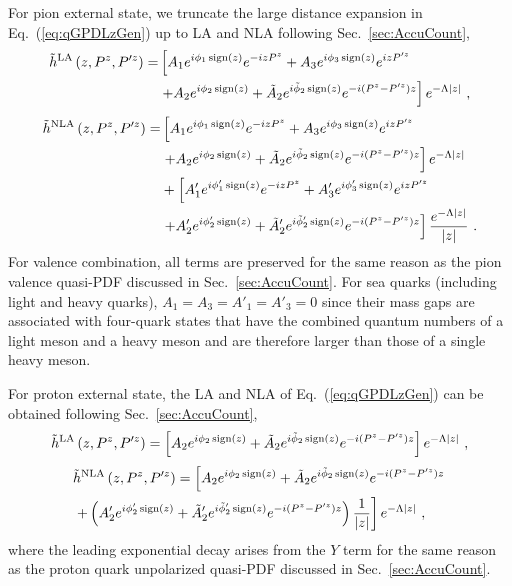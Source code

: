 \documentclass[a4paper,11pt]{article}
\begin{document}
For pion external state, we truncate the large distance expansion in Eq.~(\ref{eq:qGPDLzGen}) up to LA and NLA following Sec.~\ref{sec:AccuCount},
\begin{align}
\tilde{h}^{\rm LA}\left(z,P^z,P'^z\right) =
&\left[A_1 e^{i \phi_1 \, {\rm sign}(z)} e^{-i z P^z} + A_3 e^{i \phi_3 \, {\rm sign}(z)} e^{i z P'^z}  \right. \nonumber\\
&\left.+A_2 e^{i \phi_2 \, {\rm sign}(z)} + \tilde{A}_2 e^{i \tilde{\phi}_2 \, {\rm sign}(z)} e^{-i(P^z-P'^z)z}  \right] e^{-\Lambda |z|} \ ,
\end{align}
\begin{align}
\tilde{h}^{\rm NLA}\left(z,P^z,P'^z\right) =
&\left[A_1 e^{i \phi_1 \, {\rm sign}(z)} e^{-i z P^z}  + A_3 e^{i \phi_3 \, {\rm sign}(z)} e^{i z P'^z} \right. \nonumber\\
&\left.+A_2 e^{i \phi_2 \, {\rm sign}(z)} + \tilde{A}_2 e^{i \tilde{\phi}_2 \, {\rm sign}(z)} e^{-i(P^z-P'^z)z}\right]e^{-\Lambda |z|} \nonumber\\ 
&+\left[A'_1 e^{i \phi'_1 \, {\rm sign}(z)} e^{-i z P^z} + A'_3 e^{i \phi'_3 \, {\rm sign}(z)} e^{i z P'^z} \right. \nonumber\\
&\left.+A'_2 e^{i \phi'_2 \, {\rm sign}(z)} + \tilde{A}'_2 e^{i \tilde{\phi}'_2 \, {\rm sign}(z)} e^{-i(P^z-P'^z)z} \right] \frac{e^{-\Lambda |z|}}{|z|} \ .
\end{align}
For valence combination, all terms are preserved for the same reason as the pion valence quasi-PDF discussed in Sec.~\ref{sec:AccuCount}. For sea quarks (including light and heavy quarks), $A_1 = A_3 = A'_1 = A'_3 = 0$ since their mass gaps are associated with four-quark states that have the combined quantum numbers of a light meson and a heavy meson and are therefore larger than those of a single heavy meson.

For proton external state, the LA and NLA of Eq.~(\ref{eq:qGPDLzGen}) can be obtained following Sec.~\ref{sec:AccuCount},
\begin{align}\label{eq:protonqGPDLA}
\tilde{h}^{\rm LA}\left(z,P^z,P'^z\right) = 
\left[ A_2 e^{i \phi_2 \, {\rm sign}(z)} + \tilde{A}_2 e^{i \tilde{\phi}_2 \, {\rm sign}(z)} e^{-i(P^z-P'^z)z} \right] e^{-\Lambda |z|}  \ ,
\end{align}
\begin{align}\label{eq:protonqGPDNLA}
&\tilde{h}^{\rm NLA}\left(z,P^z,P'^z\right) = 
\left[ A_2 e^{i \phi_2 \, {\rm sign}(z)} + \tilde{A}_2 e^{i \tilde{\phi}_2 \, {\rm sign}(z)} e^{-i(P^z-P'^z)z} \right.\nonumber\\ 
&\left.+ \left( A'_2 e^{i \phi'_2 \, {\rm sign}(z)} + \tilde{A}'_2 e^{i \tilde{\phi}'_2 \, {\rm sign}(z)} e^{-i(P^z-P'^z)z} \right) \frac{1}{|z|}  \right] e^{-\Lambda |z|}  \ ,
\end{align}
where the leading exponential decay arises from the $Y$ term for the same reason as the proton quark unpolarized quasi-PDF discussed in Sec.~\ref{sec:AccuCount}.
\end{document}
